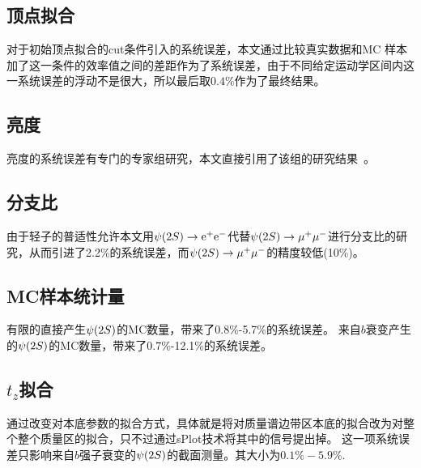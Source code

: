 \subsection{顶点拟合}
对于初始顶点拟合的cut条件引入的系统误差，本文通过比较真实数据和MC 样本加了这一条件的效率值之间的差距作为了系统误差，由于不同给定运动学区间内这一系统误差的浮动不是很大，所以最后取$0.4\%$作为了最终结果。

\subsection{亮度}
亮度的系统误差有专门的专家组研究，本文直接引用了该组的研究结果~\cite{Aaij:2011er}。

\subsection{分支比}
由于轻子的普适性允许本文用${\psi{(2S)}}\rightarrow{\rm e}^{+}{\rm e}^{-}$代替${\psi{(2S)}}\rightarrow\mu^{+}\mu^{-}$进行分支比的研究，从而引进了2.2\%的系统误差，而${\psi{(2S)}}\rightarrow\mu^{+}\mu^{-}$的精度较低(10\%)。

\subsection{MC样本统计量}
有限的直接产生${\psi{(2S)}}$的MC数量，带来了0.8\%-5.7\%的系统误差。
来自$b$衰变产生的${\psi{(2S)}}$的MC数量，带来了0.7\%-12.1\%的系统误差。

\subsection{$t_z$拟合}
通过改变对本底参数的拟合方式，具体就是将对质量谱边带区本底的拟合改为对整个整个质量区的拟合，只不过通过sPlot技术将其中的信号提出掉。
这一项系统误差只影响来自$b$强子衰变的${\psi{(2S)}}$的截面测量。其大小为$0.1\%-5.9\%$.

